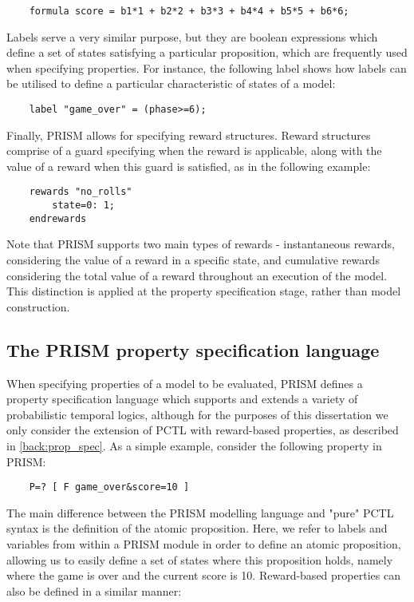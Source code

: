 \begin{verbatim}
    formula score = b1*1 + b2*2 + b3*3 + b4*4 + b5*5 + b6*6;
\end{verbatim}

Labels serve a very similar purpose, but they are boolean expressions which define a set of states satisfying a particular proposition, which are frequently used when specifying properties. For instance, the following label shows how labels can be utilised to define a particular characteristic of states of a model:

\begin{verbatim}
    label "game_over" = (phase>=6);
\end{verbatim}

Finally, PRISM allows for specifying reward structures. Reward structures comprise of a guard specifying when the reward is applicable, along with the value of a reward when this guard is satisfied, as in the following example:


\begin{verbatim}
    rewards "no_rolls"
        state=0: 1;
    endrewards
\end{verbatim}

Note that PRISM supports two main types of rewards - instantaneous rewards, considering the value of a reward in a specific state, and cumulative rewards considering the total value of a reward throughout an execution of the model. This distinction is applied at the property specification stage, rather than model construction.

\subsection{The PRISM property specification language}
\label{back:PRISM-prop}

When specifying properties of a model to be evaluated, PRISM defines a property specification language which supports and extends a variety of probabilistic temporal logics, although for the purposes of this dissertation we only consider the extension of PCTL with reward-based properties, as described in \ref{back:prop_spec}. As a simple example, consider the following property in PRISM:

\begin{verbatim}
    P=? [ F game_over&score=10 ]
\end{verbatim}

The main difference between the PRISM modelling language and "pure" PCTL syntax is the definition of the atomic proposition. Here, we refer to labels and variables from within a PRISM module in order to define an atomic proposition, allowing us to easily define a set of states where this proposition holds, namely where the game is over and the current score is 10. Reward-based properties can also be defined in a similar manner:

